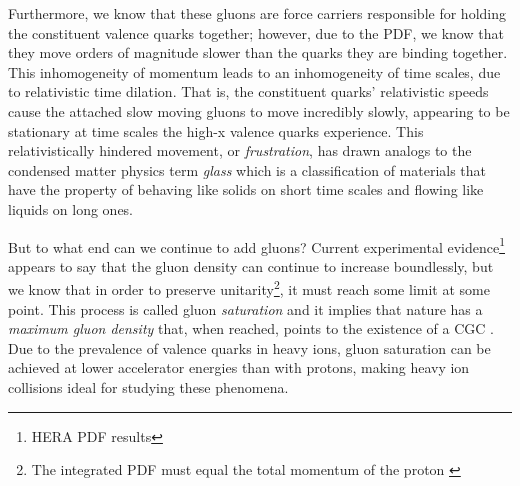 Furthermore, we know that these gluons are force carriers responsible for holding the constituent valence quarks together; however, due to the PDF, we know that they move orders of magnitude slower than the quarks they are binding together. This inhomogeneity of momentum leads to an inhomogeneity of time scales, due to relativistic time dilation. That is, the constituent quarks' relativistic speeds cause the attached slow moving gluons to move incredibly slowly, appearing to be stationary at time scales the high-x valence quarks experience. This relativistically hindered movement, or \textit{frustration}, has drawn analogs to the condensed matter physics term \textit{glass} which is a classification of materials that have the property of behaving like solids on short time scales and flowing like liquids on long ones. 

But to what end can we continue to add gluons? Current experimental evidence\footnote{HERA PDF results} appears to say that the gluon density can continue to increase boundlessly, but we know that in order to preserve unitarity\footnote{The integrated PDF must equal the total momentum of the proton \citep{HemmickRHIClecture}}, it must reach some limit at some point. This process is called gluon \textit{saturation} and it implies that nature has a \textit{maximum gluon density} that, when reached, points to the existence of a CGC \citep{HemmickRHIClecture}. Due to the prevalence of valence quarks in heavy ions, gluon saturation can be achieved at lower accelerator energies than with protons, making heavy ion collisions ideal for studying these phenomena.

